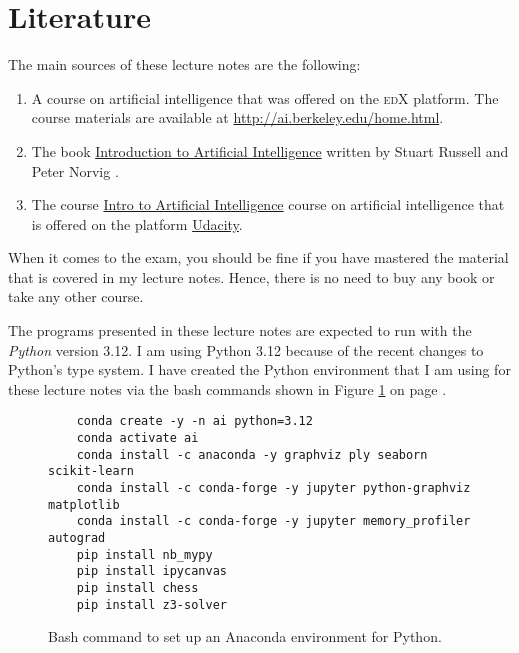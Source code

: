 \section{Literature}
The main sources of these lecture notes are the following:
\begin{enumerate}
\item A course on artificial intelligence that was offered on the \textsc{edX} platform.  The course
      materials are available at \href{http://ai.berkeley.edu/home.html}{http://ai.berkeley.edu/home.html}.
\item The book \href{https://www.amazon.de/Artificial-Intelligence-Modern-Approach-Global/dp/1292401133/}{
       Introduction to Artificial Intelligence}
      written by Stuart Russell and Peter Norvig \cite{russell:2020}.
\item The course \href{https://www.udacity.com/course/intro-to-artificial-intelligence--cs271}{
      Intro to Artificial Intelligence} course on artificial intelligence that is offered on the
      platform \href{https://www.udacity.com}{Udacity}.  
\end{enumerate}
When it comes to the exam, you should be fine if you have mastered the material that is covered in my
lecture notes.  Hence, there is no need to buy any book or take any other course.
\pagebreak

\remark
The programs presented in these lecture notes are expected to run with the \textsl{Python} version 3.12.
I am using Python 3.12 because of the recent changes to Python's type system.
I have created the Python environment that I am using for these lecture notes via the bash commands shown in
Figure \ref{fig:ai.sh} on page \pageref{fig:ai.sh}.

\begin{figure}[!ht]
\centering
\begin{verbatim}
    conda create -y -n ai python=3.12 
    conda activate ai
    conda install -c anaconda -y graphviz ply seaborn scikit-learn 
    conda install -c conda-forge -y jupyter python-graphviz matplotlib 
    conda install -c conda-forge -y jupyter memory_profiler autograd
    pip install nb_mypy
    pip install ipycanvas
    pip install chess 
    pip install z3-solver  
\end{verbatim}
\vspace*{-0.3cm}
\caption{Bash command to set up an Anaconda environment for Python.}
\label{fig:ai.sh}
\end{figure}



